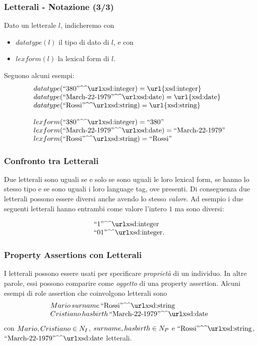 \documentclass[8pt]{beamer}
\begin{document}
\newcommand{\mathurl}[1]{\mbox{\url{#1}}}

\begin{frame}
\frametitle{Letterali - Notazione (3/3)}
Dato un letterale $l$, indicheremo con
\begin{itemize}
 \item $datatype(l)$ il tipo di dato di $l$, e con 
 \item $lexform(l)$ la lexical form di $l$.
\end{itemize}
\vspace{\baselineskip}

Seguono alcuni esempi:
\[
\begin{array}{l}
 datatype(\literal{380}{xsd:integer}) = \mathurl{xsd:integer}\\
 datatype(\literal{March-22-1979}{xsd:date}) = \mathurl{xsd:date}\\
 datatype(\literal{Rossi}{xsd:string}) = \mathurl{xsd:string}\\
 \\
 lexform(\literal{380}{xsd:integer}) = \stringLiteral{380}\\
 lexform(\literal{March-22-1979}{xsd:date}) = \stringLiteral{March-22-1979}\\
 lexform(\literal{Rossi}{xsd:string}) = \stringLiteral{Rossi} 
\end{array}
\]
\end{frame}


\begin{frame}
\frametitle{Confronto tra Letterali}
Due letterali sono uguali se e solo se sono uguali le loro lexical form,
se hanno lo stesso tipo e se sono uguali i loro language tag, ove presenti.
Di conseguenza due letterali possono essere diversi anche avendo lo stesso
\emph{valore}. Ad esempio i due seguenti letterali hanno entrambi 
come valore l'intero $1$ ma sono diversi:
\vspace{\baselineskip}

\[
 \begin{array}{l}
  \literal{1}{xsd:integer}\\
  \literal{01}{xsd:integer} .\\
 \end{array}
\]
\end{frame}

\begin{frame}
\frametitle{Property Assertions con Letterali}

I letterali possono essere usati per specificare \emph{propriet\`a} di un
individuo. In altre parole, essi possono comparire come \emph{oggetto}
di una property assertion. Alcuni esempi di role assertion che coinvolgono
letterali sono
\[
 \begin{array}{l}
  Mario \, surname \, \literal{Rossi}{xsd:string} \\
  Cristiano \, hasbirth \, \literal{March-22-1979}{xsd:date}\\
 \end{array}
\]
con $Mario, Cristiano \in N_I$, $surname, hasbirth \in N_P$ e 
$\literal{Rossi}{xsd:string}$, $\literal{March-22-1979}{xsd:date}$ letterali.

\end{frame}
\end{document}
